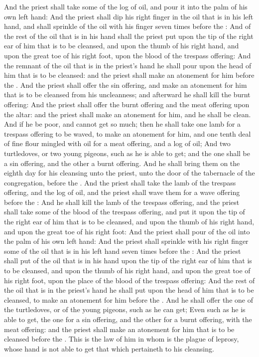 \begin{biblechapter}
\verse And the priest shall take some of the log of oil, and pour it into the palm of his own left hand:
\verse And the priest shall dip his right finger in the oil that is in his left hand, and shall sprinkle of the oil with his finger seven times before the \LORD:
\verse And of the rest of the oil that is in his hand shall the priest put upon the tip of the right ear of him that is to be cleansed, and upon the thumb of his right hand, and upon the great toe of his right foot, upon the blood of the trespass offering:
\verse And the remnant of the oil that is in the priest's hand he shall pour upon the head of him that is to be cleansed: and the priest shall make an atonement for him before the \LORD.
\verse And the priest shall offer the sin offering, and make an atonement for him that is to be cleansed from his uncleanness; and afterward he shall kill the burnt offering:
\verse And the priest shall offer the burnt offering and the meat offering upon the altar: and the priest shall make an atonement for him, and he shall be clean.
\verse And if he be poor, and cannot get so much; then he shall take one lamb for a trespass offering to be waved, to make an atonement for him, and one tenth deal of fine flour mingled with oil for a meat offering, and a log of oil;
\verse And two turtledoves, or two young pigeons, such as he is able to get; and the one shall be a sin offering, and the other a burnt offering.
\verse And he shall bring them on the eighth day for his cleansing unto the priest, unto the door of the tabernacle of the congregation, before the \LORD.
\verse And the priest shall take the lamb of the trespass offering, and the log of oil, and the priest shall wave them for a wave offering before the \LORD:
\verse And he shall kill the lamb of the trespass offering, and the priest shall take some of the blood of the trespass offering, and put it upon the tip of the right ear of him that is to be cleansed, and upon the thumb of his right hand, and upon the great toe of his right foot:
\verse And the priest shall pour of the oil into the palm of his own left hand:
\verse And the priest shall sprinkle with his right finger some of the oil that is in his left hand seven times before the \LORD:
\verse And the priest shall put of the oil that is in his hand upon the tip of the right ear of him that is to be cleansed, and upon the thumb of his right hand, and upon the great toe of his right foot, upon the place of the blood of the trespass offering:
\verse And the rest of the oil that is in the priest's hand he shall put upon the head of him that is to be cleansed, to make an atonement for him before the \LORD.
\verse And he shall offer the one of the turtledoves, or of the young pigeons, such as he can get;
\verse Even such as he is able to get, the one for a sin offering, and the other for a burnt offering, with the meat offering: and the priest shall make an atonement for him that is to be cleansed before the \LORD.
\verse This is the law of him in whom is the plague of leprosy, whose hand is not able to get that which pertaineth to his cleansing.

\end{biblechapter}
